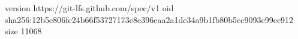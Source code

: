 version https://git-lfs.github.com/spec/v1
oid sha256:12b5e806fc24b66f53727173e8e396eaa2a1dc34a9b1fb80b5ec9093e99ee912
size 11068
